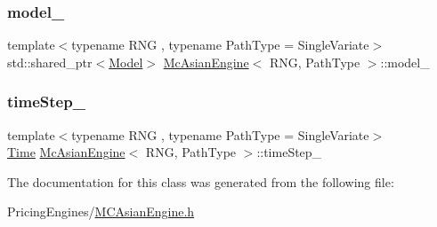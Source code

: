 \hypertarget{class_mc_asian_engine_a8c94082ee2d4169b704428ebb4b30965}{}\label{class_mc_asian_engine_a8c94082ee2d4169b704428ebb4b30965} 
\subsubsection{\texorpdfstring{model\+\_\+}{model\_}}
{\footnotesize\ttfamily template$<$typename R\+NG , typename Path\+Type  = Single\+Variate$>$ \\
std\+::shared\+\_\+ptr$<$\hyperlink{class_model}{Model}$>$ \hyperlink{class_mc_asian_engine}{Mc\+Asian\+Engine}$<$ R\+NG, Path\+Type $>$\+::model\+\_\+\hspace{0.3cm}{\ttfamily [private]}}

\hypertarget{class_mc_asian_engine_a4775a2c94f7267e29aaf614b454f3926}{}\label{class_mc_asian_engine_a4775a2c94f7267e29aaf614b454f3926} 
\subsubsection{\texorpdfstring{time\+Step\+\_\+}{timeStep\_}}
{\footnotesize\ttfamily template$<$typename R\+NG , typename Path\+Type  = Single\+Variate$>$ \\
\hyperlink{_name_def_8h_ac2d3e0ba793497bcca555c7c2cf64ff3}{Time} \hyperlink{class_mc_asian_engine}{Mc\+Asian\+Engine}$<$ R\+NG, Path\+Type $>$\+::time\+Step\+\_\+\hspace{0.3cm}{\ttfamily [private]}}



The documentation for this class was generated from the following file\+:\begin{DoxyCompactItemize}
\item 
Pricing\+Engines/\hyperlink{_m_c_asian_engine_8h}{M\+C\+Asian\+Engine.\+h}\end{DoxyCompactItemize}
